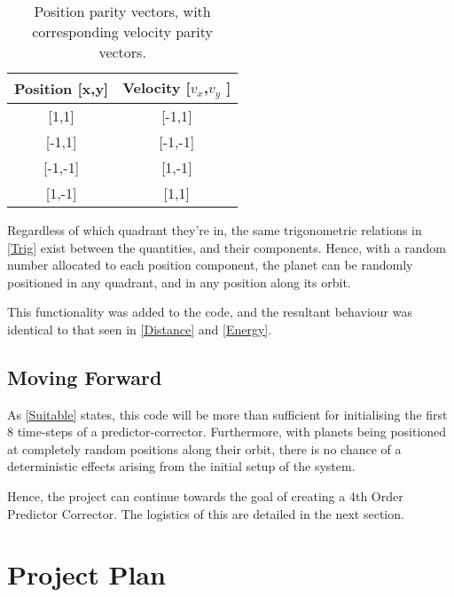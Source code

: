 \documentclass[a4paper,10pt]{article}
\begin{document}
\begin{table}[h!]
\centering
\def\arraystretch{1.7}
\begin{tabular}{c|c}
\multicolumn{1}{l|}{Position {[}x,y{]}} & \multicolumn{1}{l}{Velocity {[}$v_x$,$v_y$ {]}} \\ \hline
{[}1,1{]}                               & {[}-1,1{]}                                      \\ \hline
{[}-1,1{]}                              & {[}-1,-1{]}                                     \\ \hline
{[}-1,-1{]}                             & {[}1,-1{]}                                      \\ \hline
{[}1,-1{]}                              & {[}1,1{]}                                      
\end{tabular}
\caption{\label{Algorithm} Position parity vectors, with corresponding velocity parity vectors.}
\end{table}

Regardless of which quadrant they're in, the same trigonometric relations in \cref{Trig} exist between the quantities, and their components. Hence, with a random number allocated to each position component, the planet can be randomly positioned in any quadrant, and in any position along its orbit.

This functionality was added to the code, and the resultant behaviour was identical to that seen in \cref{Distance} and \cref{Energy}.

\subsection{Moving Forward}

As \cref{Suitable} states, this code will be more than sufficient for initialising the first 8 time-steps of a predictor-corrector. Furthermore, with planets being positioned at completely random positions along their orbit, there is no chance of a deterministic effects arising from the initial setup of the system. 

Hence, the project can continue towards the goal of creating a 4th Order Predictor Corrector. The logistics of this are detailed in the next section.

\section{Project Plan}
\end{document}
